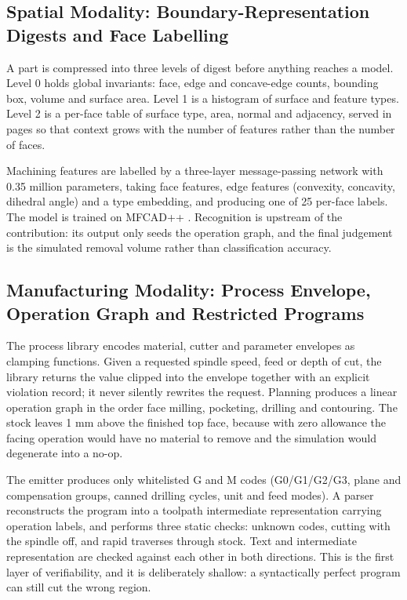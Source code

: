 \subsection{Spatial Modality: Boundary-Representation Digests and Face Labelling}

A part is compressed into three levels of digest before anything reaches a model. Level 0 holds global invariants: face, edge and concave-edge counts, bounding box, volume and surface area. Level 1 is a histogram of surface and feature types. Level 2 is a per-face table of surface type, area, normal and adjacency, served in pages so that context grows with the number of features rather than the number of faces.

Machining features are labelled by a three-layer message-passing network with 0.35 million parameters, taking face features, edge features (convexity, concavity, dihedral angle) and a type embedding, and producing one of 25 per-face labels. The model is trained on MFCAD++ \cite{Colligan2022}. Recognition is upstream of the contribution: its output only seeds the operation graph, and the final judgement is the simulated removal volume rather than classification accuracy.

\subsection{Manufacturing Modality: Process Envelope, Operation Graph and Restricted Programs}

The process library encodes material, cutter and parameter envelopes as clamping functions. Given a requested spindle speed, feed or depth of cut, the library returns the value clipped into the envelope together with an explicit violation record; it never silently rewrites the request. Planning produces a linear operation graph in the order face milling, pocketing, drilling and contouring. The stock leaves 1 mm above the finished top face, because with zero allowance the facing operation would have no material to remove and the simulation would degenerate into a no-op.

The emitter produces only whitelisted G and M codes (G0/G1/G2/G3, plane and compensation groups, canned drilling cycles, unit and feed modes). A parser reconstructs the program into a toolpath intermediate representation carrying operation labels, and performs three static checks: unknown codes, cutting with the spindle off, and rapid traverses through stock. Text and intermediate representation are checked against each other in both directions. This is the first layer of verifiability, and it is deliberately shallow: a syntactically perfect program can still cut the wrong region.

